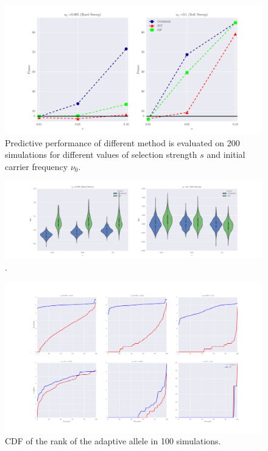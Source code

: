 \documentclass[11pt]{article}
\begin{document}
\begin{figure}[H]
	\centering
	\includegraphics[trim=.2in 0 .2in 0 , clip,width=\textwidth]{power.pdf}
	\caption{Predictive performance of different method is evaluated on 200 
		simulations for different values of selection strength $s$ and initial 
		carrier frequency $\nu_0$.} \label{fig:power}
\end{figure}

\begin{figure}[H]
	\centering
	\includegraphics[trim=.2in 0 .2in 0 , clip,width=\textwidth]{bias.pdf}
	\caption{.} \label{fig:bias}
\end{figure}

\begin{figure}[H]
	\centering
	\includegraphics[trim=.2in 0 .2in 0, 
	clip,width=\textwidth]{rank.pdf}
	\caption{CDF of the rank of the adaptive allele in 100 simulations.} 
	\label{fig:rank}
\end{figure}
\end{document}
